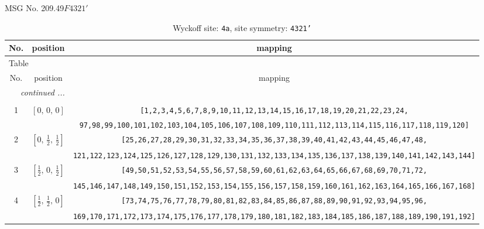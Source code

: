 \documentclass[fleqn,8pt]{jsarticle}
\begin{document}
\setcounter{MaxMatrixCols}{32}

\renewcommand{\tablename}{Table~}
\renewcommand{\figurename}{Figure~}
\begin{center}
\LARGE
MSG No. 209.49\quad$F4321'$
\end{center}
\renewcommand{\arraystretch}{1.2}
\begin{longtable}{ccc}
\caption{Wyckoff site: {\tt 4a}, site symmetry: {\tt 4321'}}
 \\
 \hline \hline
No. & position & mapping \\ \hline \endfirsthead

\multicolumn{2}{l}{\tablename\ \thetable{}} \\
 \hline \hline
No. & position & mapping \\ \hline \endhead

 \hline \hline
\multicolumn{2}{r}{\footnotesize\it continued ...} \\ \endfoot

 \hline \hline
\multicolumn{2}{r}{} \\ \endlastfoot

1 & $\left[ 0,\, 0,\, 0 \right]$ & {\tt [1,2,3,4,5,6,7,8,9,10,11,12,13,14,15,16,17,18,19,20,21,22,23,24,} \\ \hline
 &  & {\tt 97,98,99,100,101,102,103,104,105,106,107,108,109,110,111,112,113,114,115,116,117,118,119,120]} \\ \hline
2 & $\left[ 0,\, \frac{1}{2},\, \frac{1}{2} \right]$ & {\tt [25,26,27,28,29,30,31,32,33,34,35,36,37,38,39,40,41,42,43,44,45,46,47,48,} \\ \hline
 &  & {\tt 121,122,123,124,125,126,127,128,129,130,131,132,133,134,135,136,137,138,139,140,141,142,143,144]} \\ \hline
3 & $\left[ \frac{1}{2},\, 0,\, \frac{1}{2} \right]$ & {\tt [49,50,51,52,53,54,55,56,57,58,59,60,61,62,63,64,65,66,67,68,69,70,71,72,} \\ \hline
 &  & {\tt 145,146,147,148,149,150,151,152,153,154,155,156,157,158,159,160,161,162,163,164,165,166,167,168]} \\ \hline
4 & $\left[ \frac{1}{2},\, \frac{1}{2},\, 0 \right]$ & {\tt [73,74,75,76,77,78,79,80,81,82,83,84,85,86,87,88,89,90,91,92,93,94,95,96,} \\ \hline
 &  & {\tt 169,170,171,172,173,174,175,176,177,178,179,180,181,182,183,184,185,186,187,188,189,190,191,192]} \\
\end{longtable}
\renewcommand{\arraystretch}{1.2}
\end{document}

